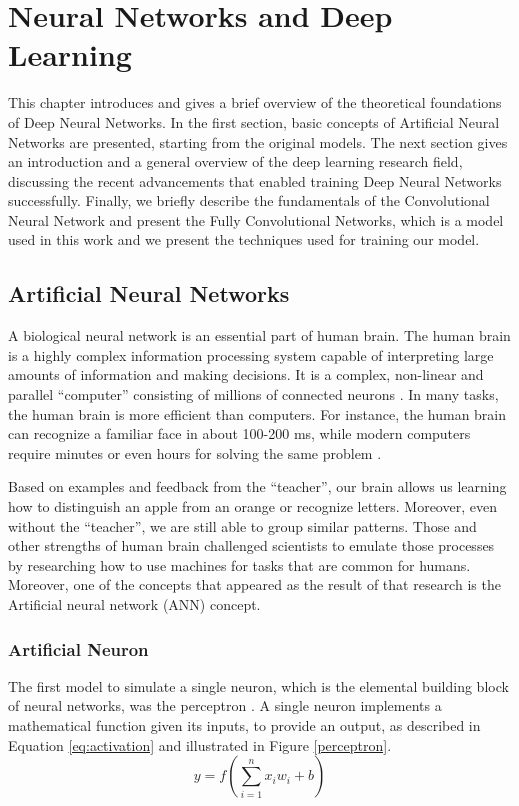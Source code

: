 
\chapter{Neural Networks and Deep Learning} \label{ch:nndl}
This chapter introduces and gives a brief overview of the theoretical foundations
of Deep Neural Networks. In the first section, basic concepts of Artificial Neural Networks are presented, starting from the original models. The next section gives an introduction and a general overview of the deep learning research field, discussing the recent advancements that enabled training Deep Neural Networks successfully. Finally, we briefly describe the fundamentals of the Convolutional Neural Network and present the Fully Convolutional Networks, which is a model used in this work and we present the techniques used for training our model.

\section{Artificial Neural Networks}

A biological neural network is an essential part of human brain. The human brain is a highly complex information processing system capable of interpreting large amounts of information and making decisions. It is a complex, non-linear and parallel ``computer'' consisting of millions of connected neurons \cite{haykin2009neural}. In many tasks, the human brain is more efficient than computers. For instance, the human brain can recognize a familiar face in about 100-200 ms, while modern computers require minutes or even hours for solving the same problem \cite{haykin2009neural}.

Based on examples and feedback from the ``teacher'', our brain allows us learning how to
distinguish an apple from an orange or recognize letters. Moreover, even without the ``teacher'', we are still able to group similar patterns. Those and other strengths of human brain challenged scientists to emulate those processes by researching how to use machines for tasks that are common for humans. Moreover, one of the concepts that appeared as the result of that research is the Artificial neural network (ANN) concept. 

\subsection{Artificial Neuron}
The first model to simulate a single neuron, which is the elemental building block of neural networks, was the perceptron \cite{rosenblatt1958perceptron}. A single neuron implements a mathematical function given its inputs, to provide an output, as described in Equation \ref{eq:activation} and illustrated in Figure \ref{perceptron}.
\begin{equation}
y = f(\sum_{i=1}^{n} x_{i}w_{i} + b)
\label{eq:activation}
\end{equation}

